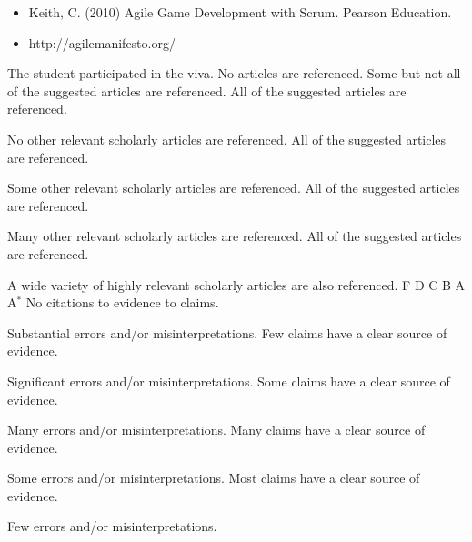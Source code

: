 \documentclass{../fal_assignment}
\begin{document}
\begin{itemize}
    \item Keith, C. (2010) Agile Game Development with Scrum. Pearson Education.
    \item http://agilemanifesto.org/
\end{itemize}

\begin{markingrubric}
%
        \grade 		The student participated in the viva.
%
        \grade\fail	No articles are referenced. 
        \grade		{} Some but not all of the suggested articles are referenced.
        \grade		{} All of the suggested articles are referenced.
        \par		No other relevant scholarly articles are referenced.
        \grade		{} All of the suggested articles are referenced.
        \par		Some other relevant scholarly articles are referenced.
        \grade		All of the suggested articles are referenced.
        \par		Many other relevant scholarly articles are referenced.
        \grade		All of the suggested articles are referenced.
        \par		A wide variety of highly relevant scholarly articles are also referenced.
%
        \grade\fail F
        \grade		D
        \grade		C
        \grade		B
        \grade		A
        \grade		A$^*$
%
        \grade\fail 	No citations to evidence to claims.
        \par 		Substantial errors and/or misinterpretations.
        \grade 		Few claims have a clear source of evidence.
        \par 		Significant errors and/or misinterpretations.
        \grade 		Some claims have a clear source of evidence.
        \par 		Many errors and/or misinterpretations.
        \grade 		Many claims have a clear source of evidence.
        \par 		Some errors and/or misinterpretations.
        \grade 		Most claims have a clear source of evidence.
        \par 		Few errors and/or misinterpretations.

\end{markingrubric}
\end{document}
